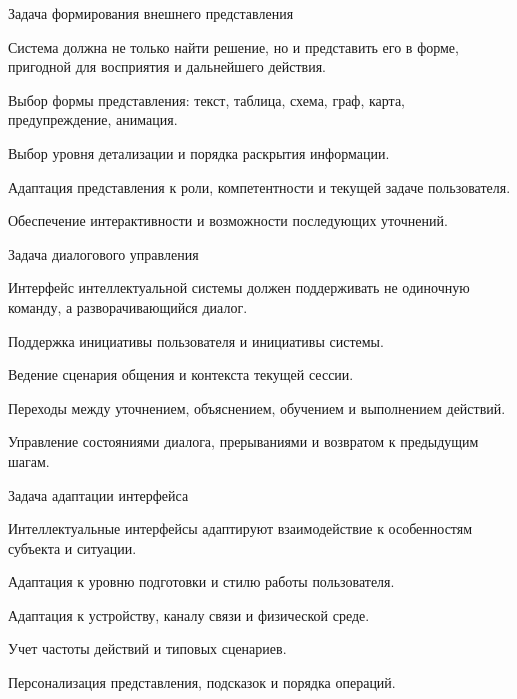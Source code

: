 \begin{frame}{Задача формирования внешнего представления}
	\topline
	\justifying

	Система должна не только найти решение, но и представить его в форме, пригодной для восприятия и дальнейшего действия.
	
	\begin{textitemize}
		\item Выбор формы представления: текст, таблица, схема, граф, карта, предупреждение, анимация.
		\item Выбор уровня детализации и порядка раскрытия информации.
		\item Адаптация представления к роли, компетентности и текущей задаче пользователя.
		\item Обеспечение интерактивности и возможности последующих уточнений.
	\end{textitemize}
\end{frame}

\begin{frame}{Задача диалогового управления}
	\topline
	\justifying

	Интерфейс интеллектуальной системы должен поддерживать не одиночную команду, а разворачивающийся диалог.
	
	\begin{textitemize}
		\item Поддержка инициативы пользователя и инициативы системы.
		\item Ведение сценария общения и контекста текущей сессии.
		\item Переходы между уточнением, объяснением, обучением и выполнением действий.
		\item Управление состояниями диалога, прерываниями и возвратом к предыдущим шагам.
	\end{textitemize}
\end{frame}

\begin{frame}{Задача адаптации интерфейса}
	\topline
	\justifying

	Интеллектуальные интерфейсы адаптируют взаимодействие к особенностям субъекта и ситуации.
	
	\begin{textitemize}
		\item Адаптация к уровню подготовки и стилю работы пользователя.
		\item Адаптация к устройству, каналу связи и физической среде.
		\item Учет частоты действий и типовых сценариев.
		\item Персонализация представления, подсказок и порядка операций.
	\end{textitemize}
\end{frame}

